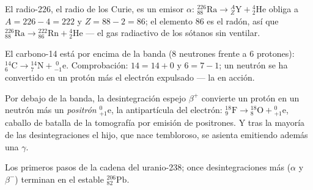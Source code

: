\begin{example}\label{ex:g11:nucleus-radioactivity:alpha}
El radio-226, el radio de los Curie, es un emisor $\alpha$:
${}^{226}_{88}\mathrm{Ra} \to {}^{A}_{Z}\mathrm{Y} + {}^{4}_{2}\mathrm{He}$
obliga a $A = 226 - 4 = 222$ y $Z = 88 - 2 = 86$; el elemento $86$ es el
radón, así que
${}^{226}_{88}\mathrm{Ra} \to {}^{222}_{86}\mathrm{Rn} + {}^{4}_{2}\mathrm{He}$
--- el gas radiactivo de los sótanos sin ventilar.
\end{example}

\begin{example}\label{ex:g11:nucleus-radioactivity:beta}
El carbono-14 está por encima de la banda ($8$ neutrones frente a $6$
protones):
${}^{14}_{6}\mathrm{C} \to {}^{14}_{7}\mathrm{N} + {}^{\;0}_{-1}\mathrm{e}$.
Comprobación: $14 = 14 + 0$ y $6 = 7 - 1$; un neutrón se ha convertido
en un protón más el electrón expulsado --- la  en
acción.
\end{example}

\begin{remark}\label{rem:g11:nucleus-radioactivity:betaplus}
Por debajo de la banda, la desintegración espejo $\beta^+$ convierte un
protón en un neutrón más un \emph{positrón}
${}^{0}_{+1}\mathrm{e}$, la antipartícula del electrón:
${}^{18}_{9}\mathrm{F} \to {}^{18}_{8}\mathrm{O} + {}^{0}_{+1}\mathrm{e}$,
caballo de batalla de la tomografía por emisión de positrones. Y tras la
mayoría de las desintegraciones el  hijo, que nace tembloroso, se
asienta emitiendo además una $\gamma$.
\end{remark}

\begin{omfigure}

{\small Los primeros pasos de la cadena del uranio-238; once
desintegraciones más ($\alpha$ y $\beta^-$) terminan en el estable
${}^{206}_{82}\mathrm{Pb}$.}
\end{omfigure}

